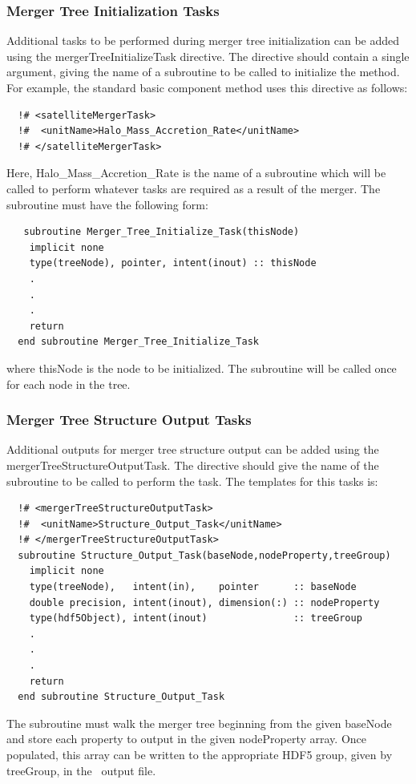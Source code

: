 \subsubsection{Merger Tree Initialization Tasks}

Additional tasks to be performed during merger tree initialization can be added using the {\normalfont \ttfamily mergerTreeInitializeTask} directive. The directive should contain a single argument, giving the name of a subroutine to be called to initialize the method. For example, the {\normalfont \ttfamily standard} basic component method uses this directive as follows:
\begin{verbatim}
  !# <satelliteMergerTask>
  !#  <unitName>Halo_Mass_Accretion_Rate</unitName>
  !# </satelliteMergerTask>
\end{verbatim}
Here, {\normalfont \ttfamily Halo\_Mass\_Accretion\_Rate} is the name of a subroutine which will be called to perform whatever tasks are required as a result of the merger. The subroutine must have the following form:
\begin{verbatim}
   subroutine Merger_Tree_Initialize_Task(thisNode)
    implicit none
    type(treeNode), pointer, intent(inout) :: thisNode
    .
    .
    .
    return
  end subroutine Merger_Tree_Initialize_Task
\end{verbatim}
where {\normalfont \ttfamily thisNode} is the node to be initialized. The subroutine will be called once for each node in the tree.

\subsubsection{Merger Tree Structure Output Tasks}

Additional outputs for merger tree structure output can be added using the {\normalfont \ttfamily mergerTreeStructureOutputTask}. The directive should give the name of the subroutine to be called to perform the task. The templates for this tasks is:
\begin{verbatim}
  !# <mergerTreeStructureOutputTask>
  !#  <unitName>Structure_Output_Task</unitName>
  !# </mergerTreeStructureOutputTask>
  subroutine Structure_Output_Task(baseNode,nodeProperty,treeGroup)
    implicit none
    type(treeNode),   intent(in),    pointer      :: baseNode
    double precision, intent(inout), dimension(:) :: nodeProperty
    type(hdf5Object), intent(inout)               :: treeGroup
    .
    .
    .
    return
  end subroutine Structure_Output_Task
\end{verbatim}
The subroutine must walk the merger tree beginning from the given {\normalfont \ttfamily baseNode} and store each property to output in the given {\normalfont \ttfamily nodeProperty} array. Once populated, this array can be written to the appropriate HDF5 group, given by {\normalfont \ttfamily treeGroup}, in the \glc\ output file.

